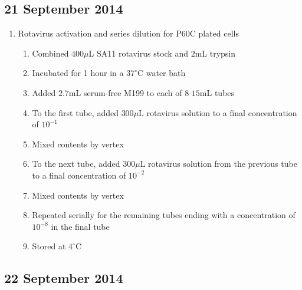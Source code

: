 
\subsection*{21 September 2014}

\begin{enumerate}
	\item Rotavirus activation and series dilution for P60C plated cells
		\begin{enumerate}
			\item Combined $400\mu$L SA11 rotavirus stock and $2$mL trypsin
			\item Incubated for 1 hour in a $37^{\circ}$C water bath
			\item Added $2.7$mL serum-free M199 to each of 8 $15$mL tubes
			\item To the first tube, added $300\mu$L rotavirus solution to a final concentration of $10^{-1}$
			\item Mixed contents by vertex
			\item To the next tube, added $300\mu$L rotavirus solution from the previous tube to a final concentration of $10^{-2}$
			\item Mixed contents by vertex
			\item Repeated serially for the remaining tubes ending with a concentration of $10^{-8}$ in the final tube
			\item Stored at $4^{\circ}$C
		\end{enumerate}
\end{enumerate}

\subsection*{22 September 2014}

